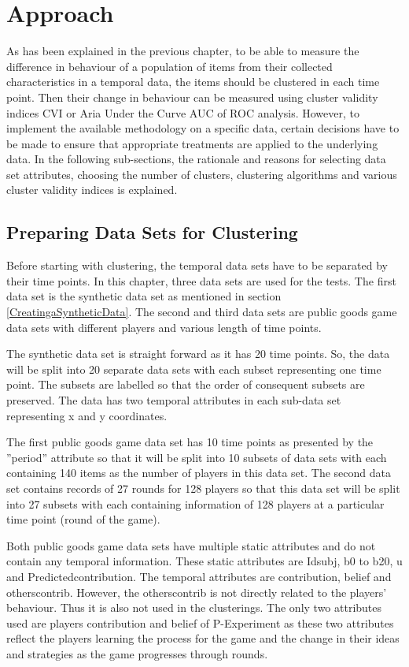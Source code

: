  
 \section{Approach}
 As has been explained in the previous chapter, to be able to measure the difference in behaviour of a population of items from their collected characteristics in a temporal data, the items should be clustered in each time point. Then their change in behaviour can be measured using cluster validity indices CVI or Aria Under the Curve AUC of ROC analysis. However, to implement the available methodology on a specific data, certain decisions have to be made to ensure that appropriate treatments are applied to the underlying data. In the following sub-sections, the rationale and reasons for selecting data set attributes, choosing the number of clusters, clustering algorithms and various cluster validity indices is explained.
 
 
 \subsection{Preparing Data Sets for Clustering}
 Before starting with clustering, the temporal data sets have to be separated by their time points. In this chapter, three data sets are used for the tests. The first data set is the synthetic data set as mentioned in section \ref{CreatingaSyntheticData}. The second and third data sets are public goods game data sets with different players and various length of time points.
 
 The synthetic data set is straight forward as it has 20 time points. So, the data will be split into 20 separate data sets with each subset representing one time point. The subsets are labelled so that the order of consequent subsets are preserved. The data has two temporal attributes in each sub-data set representing x and y coordinates.
 
 The first public goods game data set has 10 time points as presented by the ''period'' attribute so that it will be split into 10 subsets of data sets with each containing 140 items as the number of players in this data set. The second data set contains records of 27 rounds for 128 players so that this data set will be split into 27 subsets with each containing information of 128 players at a particular time point (round of the game).
 
 Both public goods game data sets have multiple static attributes and do not contain any temporal information. These static attributes are Idsubj, b0 to b20, u and Predictedcontribution. The temporal attributes are contribution, belief and otherscontrib. However, the otherscontrib is not directly related to the players' behaviour. Thus it is also not used in the clusterings. The only two attributes used are players contribution and belief of P-Experiment as these two attributes reflect the players learning the process for the game and the change in their ideas and strategies as the game progresses through rounds.
 
